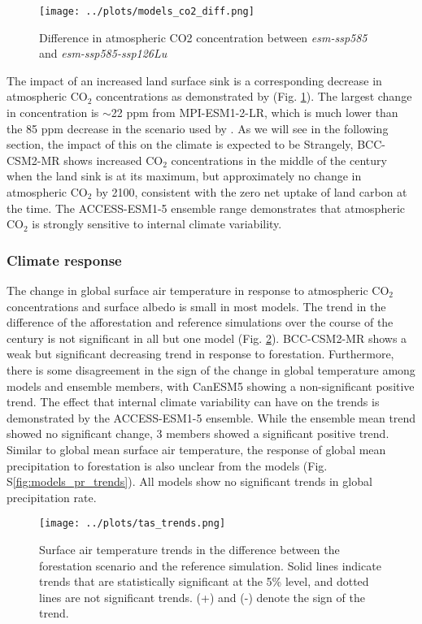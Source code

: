 \documentclass[]{article}
\begin{document}
\begin{figure}
    \centering
    \texttt{[image: ../plots/models\_co2\_diff.png]}
    \caption{Difference in atmospheric CO2 concentration between \textit{esm-ssp585} and \textit{esm-ssp585-ssp126Lu}}
    \label{fig:models_CO2}
\end{figure}

The impact of an increased land surface sink is a corresponding decrease in atmospheric CO$_2$ concentrations as demonstrated by (Fig. \ref{fig:models_CO2}).
The largest change in concentration is $\sim$22 ppm from MPI-ESM1-2-LR, which is much lower than the 85 ppm decrease in the scenario used by \cite{sonntag_reforestation_2016}.
As we will see in the following section, the impact of this on the climate is expected to be 
Strangely, BCC-CSM2-MR shows increased CO$_2$ concentrations in the middle of the century when the land sink is at its maximum, but approximately no change in atmospheric CO$_2$ by 2100, consistent with the zero net uptake of land carbon at the time.
The ACCESS-ESM1-5 ensemble range demonstrates that atmospheric CO$_2$ is strongly sensitive to internal climate variability.

\subsubsection{Climate response}

The change in global surface air temperature in response to atmospheric CO$_2$ concentrations and surface albedo is small in most models.
The trend in the difference of the afforestation and reference simulations over the course of the century is not significant in all but one model (Fig. \ref{fig:models_tas_trends}).
BCC-CSM2-MR shows a weak but significant decreasing trend in response to forestation.
Furthermore, there is some disagreement in the sign of the change in global temperature among models and ensemble members, with CanESM5 showing a non-significant positive trend.
The effect that internal climate variability can have on the trends is demonstrated by the ACCESS-ESM1-5 ensemble.
While the ensemble mean trend showed no significant change, 3 members showed a significant positive trend.
Similar to global mean surface air temperature, the response of global mean precipitation to forestation is also unclear from the models (Fig. S\ref{fig:models_pr_trends}).
All models show no significant trends in global precipitation rate.

\begin{figure}[H]
    \centering
    \texttt{[image: ../plots/tas\_trends.png]}
    \caption{Surface air temperature trends in the difference between the forestation scenario and the reference simulation. Solid lines indicate trends that are statistically significant at the 5\% level, and dotted lines are not significant trends. (+) and (-) denote the sign of the trend.}
    \label{fig:models_tas_trends}
\end{figure}
\end{document}
